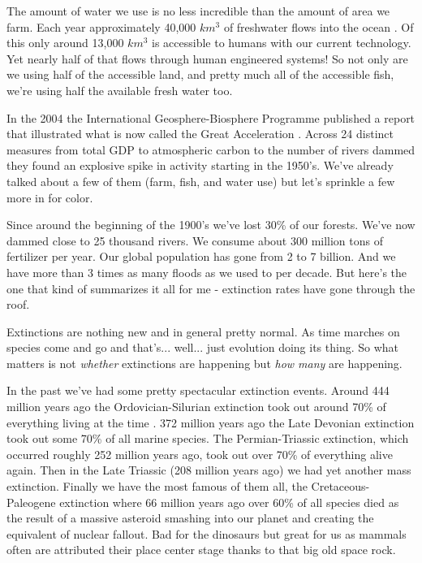 \documentclass[11pt]{book}
\begin{document}
The amount of water we use is no less incredible than the amount of area we farm. Each year approximately 40,000 $km^3$ of freshwater flows into the ocean \cite{eellis}. Of this only around 13,000 $km^3$ is accessible to humans with our current technology. Yet nearly half of that flows through human engineered systems! So not only are we using half of the accessible land, and pretty much all of the accessible fish, we're using half the available fresh water too. 

In the 2004 the International Geosphere-Biosphere Programme published a report that illustrated what is now called the Great Acceleration \cite{wsteffen}. Across 24 distinct measures from total GDP to atmospheric carbon to the number of rivers dammed they found an explosive spike in activity starting in the 1950's. We've already talked about a few of them (farm, fish, and water use) but let's sprinkle a few more in for color. 

Since around the beginning of the 1900's we've lost 30\% of our forests. We've now dammed close to 25 thousand rivers. We consume about 300 million tons of fertilizer per year. Our global population has gone from 2 to 7 billion. And we have more than 3 times as many floods as we used to per decade. But here's the one that kind of summarizes it all for me - extinction rates have gone through the roof.  
\newline

Extinctions are nothing new and in general pretty normal. As time marches on species come and go and that's... well... just evolution doing its thing. So what matters is not \textit{whether} extinctions are happening but \textit{how many} are happening. 

In the past we've had some pretty spectacular extinction events. Around 444 million years ago the Ordovician-Silurian extinction took out around 70\% of everything living at the time \cite{adubey}. 372 million years ago the Late Devonian extinction took out some 70\% of all marine species. The Permian-Triassic extinction, which occurred roughly 252 million years ago, took out over 70\% of everything alive again. Then in the Late Triassic (208 million years ago) we had yet another mass extinction. Finally we have the most famous of them all, the Cretaceous-Paleogene extinction where 66 million years ago over 60\% of all species died as the result of a massive asteroid smashing into our planet and creating the equivalent of nuclear fallout. Bad for the dinosaurs but great for us as mammals often are attributed their place center stage thanks to that big old space rock. 
\end{document}
